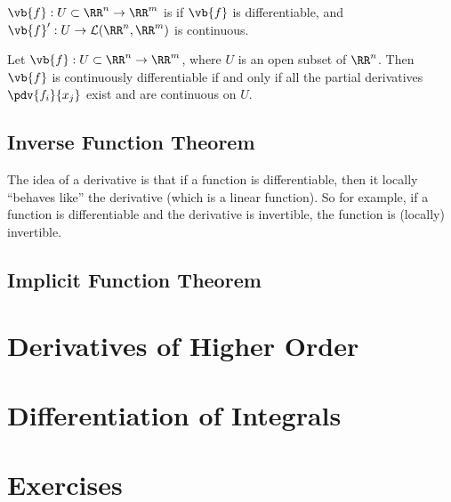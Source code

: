 \begin{definition}
$\vb{f}:U\subset\RR^n\to\RR^m$ is  if $\vb{f}$ is differentiable, and $\vb{f}^\prime:U\to\mathcal{L}(\RR^n,\RR^m)$ is continuous.
\end{definition}

\begin{proposition}
Let $\vb{f}:U\subset\RR^n\to\RR^m$, where $U$ is an open subset of $\RR^n$. Then $\vb{f}$ is continuously differentiable if and only if all the partial derivatives $\pdv{f_i}{x_j}$ exist and are continuous on $U$.
\end{proposition}

\subsection{Inverse Function Theorem}
The idea of a derivative is that if a function is differentiable, then it locally ``behaves like'' the derivative (which is a linear function). So for example, if a function is differentiable and the derivative is invertible, the function is (locally) invertible.

\subsection{Implicit Function Theorem}

\section{Derivatives of Higher Order}
\section{Differentiation of Integrals}

\pagebreak

\section*{Exercises}
